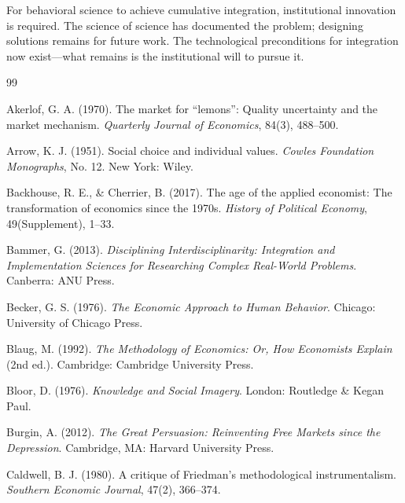 \documentclass[12pt,a4paper]{article}
\begin{document}
For behavioral science to achieve cumulative integration, institutional innovation is required. The science of science has documented the problem; designing solutions remains for future work. The technological preconditions for integration now exist---what remains is the institutional will to pursue it.



\begin{thebibliography}{99}

Akerlof, G. A. (1970). The market for ``lemons'': Quality uncertainty and the market mechanism. \textit{Quarterly Journal of Economics}, 84(3), 488--500.

Arrow, K. J. (1951). Social choice and individual values. \textit{Cowles Foundation Monographs}, No. 12. New York: Wiley.

Backhouse, R. E., \& Cherrier, B. (2017). The age of the applied economist: The transformation of economics since the 1970s. \textit{History of Political Economy}, 49(Supplement), 1--33.

Bammer, G. (2013). \textit{Disciplining Interdisciplinarity: Integration and Implementation Sciences for Researching Complex Real-World Problems}. Canberra: ANU Press.

Becker, G. S. (1976). \textit{The Economic Approach to Human Behavior}. Chicago: University of Chicago Press.

Blaug, M. (1992). \textit{The Methodology of Economics: Or, How Economists Explain} (2nd ed.). Cambridge: Cambridge University Press.

Bloor, D. (1976). \textit{Knowledge and Social Imagery}. London: Routledge \& Kegan Paul.

Burgin, A. (2012). \textit{The Great Persuasion: Reinventing Free Markets since the Depression}. Cambridge, MA: Harvard University Press.

Caldwell, B. J. (1980). A critique of Friedman's methodological instrumentalism. \textit{Southern Economic Journal}, 47(2), 366--374.


\end{thebibliography}
\end{document}
